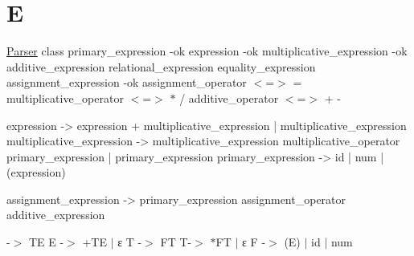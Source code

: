 \hypertarget{_e-example}{}\section{E}
\hyperlink{class_parser}{Parser} class  primary\+\_\+expression -\/ok expression -\/ok multiplicative\+\_\+expression -\/ok additive\+\_\+expression relational\+\_\+expression equality\+\_\+expression assignment\+\_\+expression -\/ok assignment\+\_\+operator $<$=$>$ \textquotesingle{}=\textquotesingle{} multiplicative\+\_\+operator $<$=$>$ \textquotesingle{}$\ast$\textquotesingle{} \textquotesingle{}/\textquotesingle{} additive\+\_\+operator $<$=$>$ \textquotesingle{}+\textquotesingle{} \textquotesingle{}-\/\textquotesingle{}

\begin{DoxyVerb}    expression -> expression + multiplicative_expression | multiplicative_expression
    multiplicative_expression -> multiplicative_expression  multiplicative_operator primary_expression
                                 | primary_expression
    primary_expression -> id | num | (expression)



    assignment_expression -> primary_expression assignment_operator additive_expression
\end{DoxyVerb}


-\/$>$ TE\textquotesingle{} E -\/$>$ +\+TE\textquotesingle{} $\vert$ ε T -\/$>$ FT\textquotesingle{} T\textquotesingle{}-\/$>$ $\ast$\+FT\textquotesingle{} $\vert$ ε F -\/$>$ (E) $\vert$ id $\vert$ num


\begin{DoxyCodeInclude}
\end{DoxyCodeInclude}
 